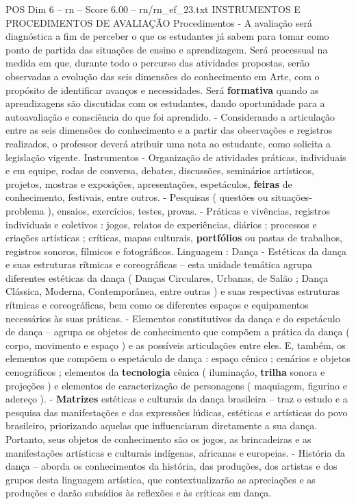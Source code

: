 \begin{textsample}{POS Dim 6 – rn – Score 6.00 – rn/rn\_ef\_23.txt}  \label{ex:f6_pos_239}
INSTRUMENTOS E PROCEDIMENTOS DE AVALIAÇÃO Procedimentos - A avaliação será diagnóstica a fim de perceber o que os estudantes já sabem para tomar como ponto de partida das situações de ensino e aprendizagem.
Será processual na medida em que, durante todo o percurso das atividades propostas, serão observadas a evolução das seis dimensões do conhecimento em Arte, com o propósito de identificar avanços e necessidades.
Será \textbf{formativa} quando as aprendizagens são discutidas com os estudantes, dando oportunidade para a autoavaliação e consciência do que foi aprendido. - Considerando a articulação entre as seis dimensões do conhecimento e a partir das observações e registros realizados, o professor deverá atribuir uma nota ao estudante, como solicita a legislação vigente.
Instrumentos - Organização de atividades práticas, individuais e em equipe, rodas de conversa, debates, discussões, seminários artísticos, projetos, mostras e exposições, apresentações, espetáculos, \textbf{feiras} de conhecimento, festivais, entre outros. - Pesquisas ( questões ou situações-problema ), ensaios, exercícios, testes, provas. - Práticas e vivências, registros individuais e coletivos : jogos, relatos de experiências, diários ; processos e criações artísticas ; críticas, mapas culturais, \textbf{portfólios} ou pastas de trabalhos, registros sonoros, fílmicos e fotográficos.
Linguagem : Dança - Estéticas da dança e suas estruturas rítmicas e coreográficas – esta unidade temática agrupa diferentes estéticas da dança ( Danças Circulares, Urbanas, de Salão ; Dança Clássica, Moderna, Contemporânea, entre outras ) e suas respectivas estruturas rítmicas e coreográficas, bem como os diferentes espaços e equipamentos necessários às suas práticas. - Elementos constitutivos da dança e do espetáculo de dança – agrupa os objetos de conhecimento que compõem a prática da dança ( corpo, movimento e espaço ) e as possíveis articulações entre eles.
E, também, os elementos que compõem o espetáculo de dança : espaço cênico ; cenários e objetos cenográficos ; elementos da \textbf{tecnologia} cênica ( iluminação, \textbf{trilha} sonora e projeções ) e elementos de caracterização de personagens ( maquiagem, figurino e adereço ). - \textbf{Matrizes} estéticas e culturais da dança brasileira – traz o estudo e a pesquisa das manifestações e das expressões lúdicas, estéticas e artísticas do povo brasileiro, priorizando aquelas que influenciaram diretamente a sua dança.
Portanto, seus objetos de conhecimento são os jogos, as brincadeiras e as manifestações artísticas e culturais indígenas, africanas e europeias. - História da dança – aborda os conhecimentos da história, das produções, dos artistas e dos grupos desta linguagem artística, que contextualizarão as apreciações e as produções e darão subsídios às reflexões e às críticas em dança.

\end{textsample}
